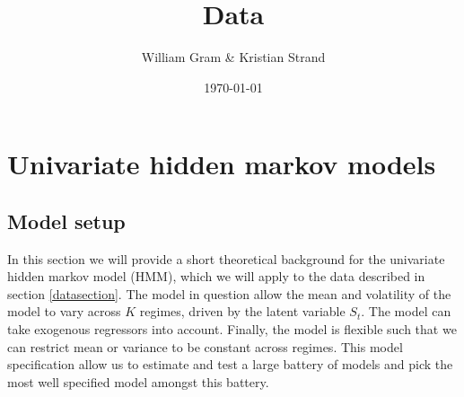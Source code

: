 \documentclass[11pt,a4paper,oneside]{article}
\title{Data}
\author{William Gram \& Kristian Strand}
\date{\today}
\begin{document}
\maketitle

\newpage

\rfoot{\thepage}

\tableofcontents

\newpage

\setcounter{page}{1}

\section{Univariate hidden markov models }
\subsection{Model setup}
\noindent In this section we will provide a short theoretical background for the univariate hidden markov model (HMM), which we will apply to the data described in section \ref{datasection}. The model in question allow the mean and volatility of the model to vary across $K$ regimes, driven by the latent variable $S_t$. The model can take exogenous regressors into account. Finally, the model is flexible such that we can restrict mean or variance to be constant across regimes. This model specification allow us to estimate and test a large battery of models and pick the most well specified model amongst this battery. 
\end{document}
